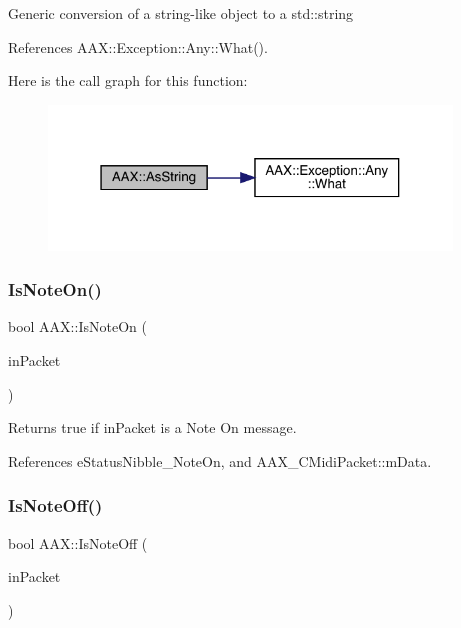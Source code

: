 Generic conversion of a string-\/like object to a std\+::string 

References A\+A\+X\+::\+Exception\+::\+Any\+::\+What().

Here is the call graph for this function\+:
\nopagebreak
\begin{figure}[H]
\begin{center}
\leavevmode
\includegraphics[width=304pt]{a00852_a9d87a7ed401f9deb8386a14c7bd8aaae_cgraph}
\end{center}
\end{figure}
\mbox{\label{a00852_a1561efb3b1dbe3d13ef18f4b4d9dee40}} 
\subsubsection{\texorpdfstring{IsNoteOn()}{IsNoteOn()}}
{\footnotesize\ttfamily bool A\+A\+X\+::\+Is\+Note\+On (\begin{DoxyParamCaption}\item[{const \mbox{\hyperlink{a01429}{A\+A\+X\+\_\+\+C\+Midi\+Packet}} $\ast$}]{in\+Packet }\end{DoxyParamCaption})\hspace{0.3cm}{\ttfamily [inline]}}



Returns true if {\ttfamily in\+Packet} is a Note On message. 



References e\+Status\+Nibble\+\_\+\+Note\+On, and A\+A\+X\+\_\+\+C\+Midi\+Packet\+::m\+Data.

\mbox{\label{a00852_a91041690c271a718ef9451f66a7f6bb2}} 
\subsubsection{\texorpdfstring{IsNoteOff()}{IsNoteOff()}}
{\footnotesize\ttfamily bool A\+A\+X\+::\+Is\+Note\+Off (\begin{DoxyParamCaption}\item[{const \mbox{\hyperlink{a01429}{A\+A\+X\+\_\+\+C\+Midi\+Packet}} $\ast$}]{in\+Packet }\end{DoxyParamCaption})\hspace{0.3cm}{\ttfamily [inline]}}



